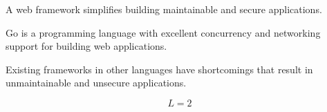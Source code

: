 \documentclass[preview]{standalone}
\begin{document}
\begin{tcolorbox}
A web framework simplifies building maintainable and secure applications.
\end{tcolorbox}


Go is a programming language with excellent concurrency and networking support for building web applications.


Existing frameworks in other languages have shortcomings that result in unmaintainable and unsecure applications.

\begin{equation}
L = 2
\end{equation}
\end{document}
